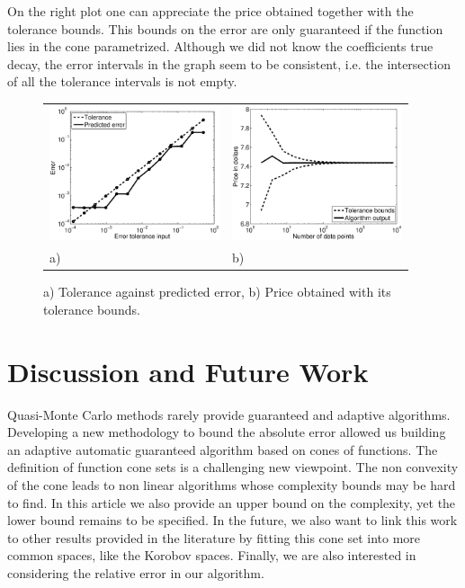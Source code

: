 \documentclass[graybox]{svmult}
\begin{document}
On the right plot one can appreciate the price obtained together with the tolerance bounds. This bounds on the error are only guaranteed if the function lies in the cone parametrized. Although we did not know the coefficients true decay, the error intervals in the graph seem to be consistent, i.e. the intersection of all the tolerance intervals is not empty.
\begin{figure}[h!]
\centering
\begin{tabular}{>{\centering}p{5cm}>{\centering}p{5cm}}
\includegraphics[width=5cm]{Images/Multicall_conv.eps} &
\includegraphics[width=5cm]{Images/Multicall_error.eps}\tabularnewline
a) & b)
\end{tabular}
\caption{a) Tolerance against predicted error, b) Price obtained with its tolerance bounds. \label{BasketOption}}
\end{figure}

\section{Discussion and Future Work}
Quasi-Monte Carlo methods rarely provide guaranteed and adaptive algorithms. Developing a new methodology to bound the absolute error allowed us building an adaptive automatic guaranteed algorithm based on cones of functions. The definition of function cone sets is a challenging new viewpoint. The non convexity of the cone leads to non linear algorithms whose complexity bounds may be hard to find. In this article we also provide an upper bound on the complexity, yet the lower bound remains to be specified. In the future, we also want to link this work to other results provided in the literature by fitting this cone set into more common spaces, like the Korobov spaces. Finally, we are also interested in considering the relative error in our algorithm.
\end{document}

